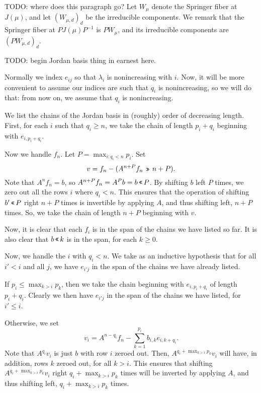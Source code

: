 \documentclass[12pt,psamsfonts]{article}
\newcommand{\leftshift}{$\,\texttt{<<}\,$}
\newcommand{\rightshift}{\mathbin{\rotatebox[origin=c]{180}{\leftshift}}}
\begin{document}
\par TODO: where does this paragraph go?
Let \(W_\mu\) denote the Springer fiber at \(J(\mu)\), and let \((W_{\mu, d})_d\) be the irreducible components.
We remark that the Springer fiber at \(PJ(\mu)P^{-1}\) is \(PW_\mu\), and its irreducible components are \((PW_{\mu, d})_d\).
\par TODO: begin Jordan basis thing in earnest here.
\par Normally we index \(e_{ij}\) so that \(\lambda_i\) is nonincreasing with \(i\).
Now, it will be more convenient to assume our indices are such that \(q_i\) is nonincreasing, so we will do that: from now on, we assume that \(q_i\) is nonincreasing.
\par We list the chains of the Jordan basis in (roughly) order of decreasing length.
First, for each \(i\) such that \(q_i \geq n\), we take the chain of length \(p_i + q_i\) beginning with \(e_{i, p_i + q_i}\).
\par Now we handle \(f_n\).
Let \(P = \max_{i : q_i < n} p_i\).
Set 
\[v = f_n - (A^{n + P}f_n \rightshift n + P).\]
Note that \(A^n f_n = b\), so \(A^{n + P} f_n = A^P b = b \leftshift P\).
By shifting \(b\) left \(P\) times, we zero out all the rows \(i\) where \(q_i < n\).
This ensures that the operation of shifting \(b' \leftshift P\) right \(n + P\) times is invertible by applying \(A\), and thus shifting left, \(n + P\) times.
So, we take the chain of length \(n + P\) beginning with \(v\).
\par Now, it is clear that each \(f_i\) is in the span of the chains we have listed so far.
It is also clear that \(b \leftshift k\) is in the span, for each \(k \geq 0\).
\par Now, we handle the \(i\) with \(q_i < n\).
We take as an inductive hypothesis that for all \(i' < i\) and all \(j\), we have \(e_{i'j}\) in the span of the chains we have already listed.
\par If \(p_i \leq \max_{k > i} p_k\), then we take the chain beginning with \(e_{i,p_i + q_i}\) of length \(p_i + q_i\).
Clearly we then have \(e_{i'j}\) in the span of the chains we have listed, for \(i' \leq i\).
\par Otherwise, we set 
\[v_i = A^{n - q_i} f_n - \sum_{k = 1}^{p_i}b_{i,k} e_{i,k + q_i}.\]
Note that \(A^{q_i} v_i\) is just \(b\) with row \(i\) zeroed out.
Then, \(A^{q_i + \max_{k > i} p_k} v_i\) will have, in addition, rows \(k\) zeroed out, for all \(k > i\).
This ensures that shifting \(A^{q_i + \max_{k > i} p_k} v_i\) right \(q_i + \max_{k > i} p_k\) times will be inverted by applying \(A\), and thus shifting left, \(q_i + \max_{k > i} p_k\) times.
\end{document}
